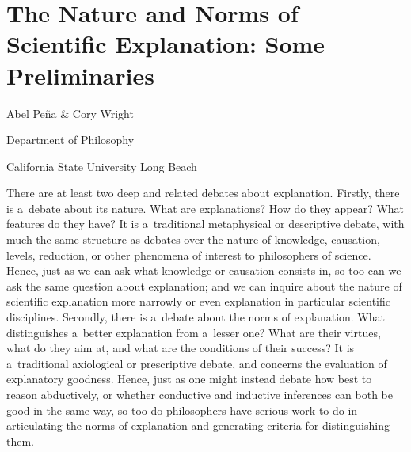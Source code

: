 \setcounter{secnumdepth}{0}

\pagestyle{Standard}


\section*{The Nature and Norms of Scientific Explanation: Some Preliminaries }
Abel Peña \& Cory Wright

Department of Philosophy

California State University Long Beach

There are at least two deep and related debates about explanation. Firstly, there is a~debate about its nature. What are explanations? How do they appear? What features do they have? It is a~traditional metaphysical or descriptive debate, with much the same structure as debates over the nature of knowledge, causation, levels, reduction, or other phenomena of interest to philosophers of science. Hence, just as we can ask what knowledge or causation consists in, so too can we ask the same question about explanation; and we can inquire about the nature of scientific explanation more narrowly or even explanation in particular scientific disciplines. Secondly, there is a~debate about the norms of explanation. What distinguishes a~better explanation from a~lesser one? What are their virtues, what do they aim at, and what are the conditions of their success? It is a~traditional axiological or prescriptive debate, and concerns the evaluation of explanatory goodness. Hence, just as one might instead debate how best to reason abductively, or whether conductive and inductive inferences can both be good in the same way, so too do philosophers have serious work to do in articulating the norms of explanation and generating criteria for distinguishing them.

